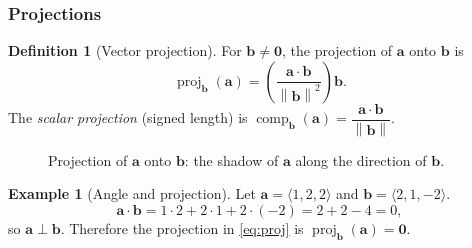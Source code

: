 \documentclass[12pt]{article}
\numberwithin{equation}{section}
\newcommand{\vect}[1]{\boldsymbol{#1}}   %
\newcommand{\norm}[1]{\left\lVert #1\right\rVert}
\theoremstyle{plain}
\theoremstyle{definition}
\newtheorem{definition}[theorem]{Definition}
\newtheorem{example}[theorem]{Example}
\theoremstyle{remark}
\begin{document}
\subsubsection{Projections}

\begin{definition}[Vector projection]
For $\vect{b}\neq\vect{0}$, the projection of $\vect{a}$ onto $\vect{b}$ is
\begin{equation}\label{eq:proj}
\operatorname{proj}_{\vect{b}}(\vect{a})
=\left(\frac{\vect{a}\cdot\vect{b}}{\norm{\vect{b}}^2}\right)\vect{b}.
\end{equation}
The \emph{scalar projection} (signed length) is
$\operatorname{comp}_{\vect{b}}(\vect{a})=\dfrac{\vect{a}\cdot\vect{b}}{\norm{\vect{b}}}$.
\end{definition}

\begin{figure}[H]
\centering
{}
\caption{Projection of $\vect{a}$ onto $\vect{b}$: the shadow of $\vect{a}$ along the direction of $\vect{b}$.}
\label{fig:projection}
\end{figure}

\begin{example}[Angle and projection]
Let $\vect{a}=\langle 1,2,2\rangle$ and $\vect{b}=\langle 2,1,-2\rangle$.
\[
\vect{a}\cdot\vect{b}=1\cdot 2+2\cdot 1+2\cdot(-2)=2+2-4=0,
\]
so $\vect{a}\perp\vect{b}$. Therefore the projection in \cref{eq:proj} is $\operatorname{proj}_{\vect{b}}(\vect{a})=\vect{0}$.
\end{example}
\end{document}
